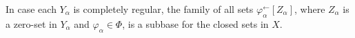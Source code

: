 In case each $Y_{\alpha}$ is completely regular, the family of all sets $\varphi_{\alpha}^{\leftarrow}[Z_{\alpha}]$, where $Z_{\alpha}$ is a zero-set in $Y_{\alpha}$ and $\varphi_{\alpha} \in \Phi$, is a subbase for the closed sets in $X$.
